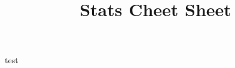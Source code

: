 \documentclass[11pt]{article}
\title{Stats Cheet Sheet}
\date{}
\begin{document}
test
\end{document}
